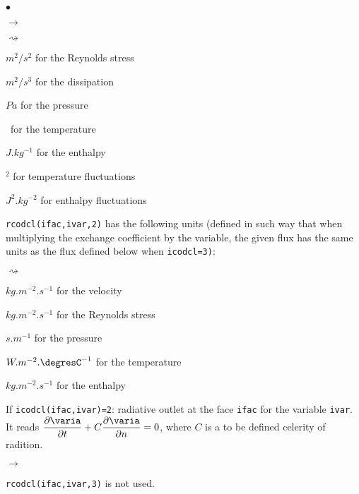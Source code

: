{{{\begin{list}{$\bullet$}{}
\begin{list}{$\rightarrow$}{}
\begin{list}{$\rightsquigarrow$}{}
\item $m^2/s^2$ for the Reynolds stress

\item $m^2/s^3$ for the dissipation

\item $Pa$ for the pressure

\item \degresC\ for the temperature

\item $J.kg^{-1}$ for the enthalpy

\item \degresC$^2$ for temperature fluctuations

\item $J^2.kg^{-2}$ for enthalpy fluctuations
\end{list}

\item \texttt{rcodcl(ifac,ivar,2)} has the following units (defined in such way that when multiplying the exchange coefficient by the variable, the
      given flux has the same units as the flux defined below when
      \texttt{icodcl=3)}:

\begin{list}{$\rightsquigarrow$}{}
\item $kg.m^{-2}.s^{-1}$ for the velocity

\item $kg.m^{-2}.s^{-1}$ for the Reynolds stress

\item $s.m^{-1}$ for the pressure

\item $W.m^{-2}.\mbox{\degresC}^{-1}$ for the temperature

\item $kg.m^{-2}.s^{-1}$ for the enthalpy
\end{list}

\end{list}

\item If \texttt{icodcl(ifac,ivar)=2}: radiative outlet at the face \texttt{ifac}
      for the variable \texttt{ivar}. It reads $ \dfrac{\partial \varia }{\partial t} + C \dfrac{\partial \varia}{\partial n} = 0 $, where $C$ is a to be defined celerity of radition.

\begin{list}{$\rightarrow$}{}
\item \texttt{rcodcl(ifac,ivar,3)} is not used.


\end{list}
\end{list}}}}

